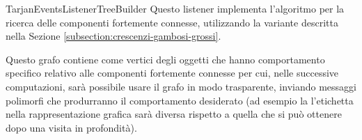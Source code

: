 \begin{paragraph}{TarjanEventsListenerTreeBuilder}
  Questo listener implementa l'algoritmo per la ricerca delle
  componenti fortemente connesse, utilizzando la variante descritta
  nella Sezione \ref{subsection:crescenzi-gambosi-grossi}.

  Questo grafo contiene come vertici degli oggetti che hanno
  comportamento specifico relativo alle componenti fortemente connesse
  per cui, nelle successive computazioni, sar\`a possibile usare il
  grafo in modo trasparente, inviando messaggi polimorfi che
  produrranno il comportamento desiderato (ad esempio la l'etichetta
  nella rappresentazione grafica sar\`a diversa rispetto a quella che
  si pu\`o ottenere dopo una visita in profondit\`a).
\end{paragraph}



